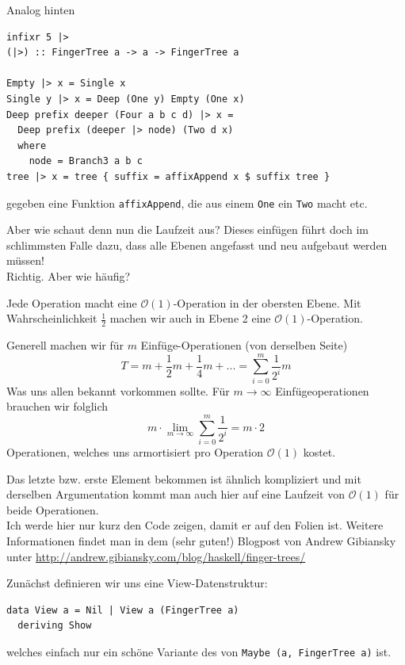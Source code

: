 \documentclass{beamer}
\begin{document}
\begin{frame}[fragile]
Analog hinten
\begin{verbatim}
infixr 5 |>
(|>) :: FingerTree a -> a -> FingerTree a

Empty |> x = Single x
Single y |> x = Deep (One y) Empty (One x)
Deep prefix deeper (Four a b c d) |> x =
  Deep prefix (deeper |> node) (Two d x)
  where
    node = Branch3 a b c
tree |> x = tree { suffix = affixAppend x $ suffix tree }
\end{verbatim}
gegeben eine Funktion \texttt{affixAppend}, die aus einem \texttt{One} ein \texttt{Two} macht etc.
\end{frame}

\begin{frame}
Aber wie schaut denn nun die Laufzeit aus? Dieses einfügen führt doch im schlimmsten Falle dazu, dass alle Ebenen angefasst und neu aufgebaut werden müssen!\\\pause
Richtig. Aber wie häufig?\\\par\pause
Jede Operation macht eine $\mathcal{O}(1)$-Operation in der obersten Ebene. Mit Wahrscheinlichkeit $\frac{1}{2}$ machen wir auch in Ebene 2 eine $\mathcal{O}(1)$-Operation.
\end{frame}

\begin{frame}
Generell machen wir für $m$ Einfüge-Operationen (von derselben Seite)
$$T = m + \frac{1}{2}m + \frac{1}{4}m + ... = \sum_{i=0}^m \frac{1}{2^i} m$$
\pause
Was uns allen bekannt vorkommen sollte. Für $m \to \infty$ Einfügeoperationen brauchen wir folglich
$$m \cdot \lim_{m \to \infty} \sum_{i=0}^m \frac{1}{2^i} = m \cdot 2$$
Operationen, welches uns armortisiert pro Operation $\mathcal{O}(1)$ kostet.
\end{frame}

\begin{frame}
Das letzte bzw. erste Element bekommen ist ähnlich kompliziert und mit derselben Argumentation kommt man auch hier auf eine Laufzeit von $\mathcal{O}(1)$ für beide Operationen.\\\pause
Ich werde hier nur kurz den Code zeigen, damit er auf den Folien ist. Weitere Informationen findet man in dem (sehr guten!) Blogpost von Andrew Gibiansky unter \url{http://andrew.gibiansky.com/blog/haskell/finger-trees/}
\end{frame}

\begin{frame}[fragile]
Zunächst definieren wir uns eine View-Datenstruktur:
\begin{verbatim}
data View a = Nil | View a (FingerTree a)
  deriving Show
\end{verbatim}
welches einfach nur ein schöne Variante des von \texttt{Maybe (a, FingerTree a)} ist.
\end{frame}
\end{document}
